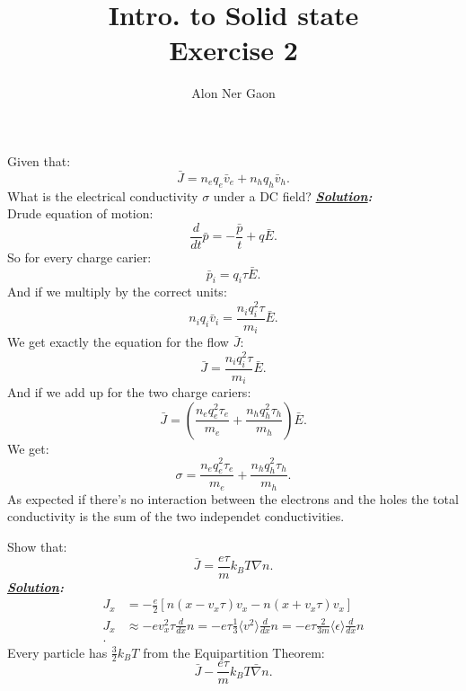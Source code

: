 \documentclass[notitlepage]{report}
\title{\Huge{Intro. to Solid state}\\Exercise 2}
\author{Alon Ner Gaon}
\begin{document}
\maketitle

\begin{question}{}{}
	Given that:\\
	 \[
	\bar{J}=n_eq_e\bar{v}_e+n_hq_h\bar{v}_h
	.\] 
	What is the electrical conductivity $\sigma$ under a DC field?
	\tcblower
	\textbf{\emph{\underline{Solution}:}}\\

Drude equation of motion:\\
\[
\frac{d}{dt}\bar{p}= - \frac{\bar{p}}{t}+q\bar{E} 
.\] 
So for every charge carier:\\
\[
\bar{p}_i=q_i\tau\bar{E}
.\] 
And if we multiply by the correct units:\\
\[
n_iq_i\bar{v}_i=\frac{n_iq_i^2\tau}{m_i}\bar{E}
.\] 
We get exactly the equation for the flow $\bar{J}$:\\
\[
\bar{J}=\frac{n_iq_i^2\tau}{m_i}\bar{E}
.\] 
And if we add up for the two charge cariers:\\
\[
	\bar{J}=\left(\frac{n_eq_e^2\tau_e}{m_e}+\frac{n_hq_h^2\tau_h}{m_h}\right) \bar{E}
.\] 
We get:\\
\[
\sigma=\frac{n_eq_e^2\tau_e}{m_e}+\frac{n_hq_h^2\tau_h}{m_h}
.\] 
As expected if there's no interaction between the electrons and the holes 
the total conductivity is the sum of the two independet conductivities.

\end{question}

\begin{question}{}{}
	Show that: \[
	\bar{J}=\frac{e\tau}{m}k_BT\nabla n
	.\] 
	\tcblower
	\textbf{\emph{\underline{Solution}:}}\\
\begin{align*}
	J_x&=-\frac{e}{2}\left[n\left(x-v_x\tau\right)v_x-n\left(x+v_x\tau\right)v_x  \right] \\
	J_x&\approx-ev_x^2 \tau\frac{d}{dx} n=-e\tau \frac{1}{3} \langle v^2 \rangle \frac{d}{dx} n=-e\tau \frac{2}{3m}\langle \epsilon \rangle \frac{d}{dx} n\\
.\end{align*}
	Every particle has $\frac{3}{2}k_BT$ from the Equipartition Theorem:\\
	\[
	\bar{J}-\frac{e\tau}{m}k_BT\bar{\nabla}n
	.\] 
\end{question}
\end{document}
